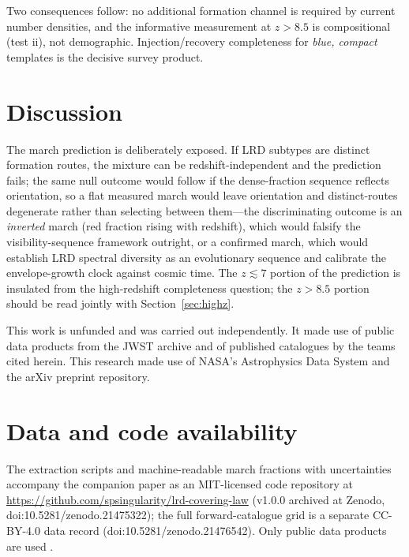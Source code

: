 \documentclass[twocolumn]{aastex631}
\begin{document}
Two consequences follow: no additional formation channel is required by
current number densities, and the informative measurement at $z>8.5$ is
compositional (test ii), not demographic. Injection/recovery completeness
for \emph{blue, compact} templates is the decisive survey product.

\section{Discussion}\label{sec:disc}
The march prediction is deliberately exposed. If LRD subtypes are
distinct formation routes, the mixture can be redshift-independent and
the prediction fails; the same null outcome would follow if the
dense-fraction sequence reflects orientation, so a flat measured march
would leave orientation and distinct-routes degenerate rather than
selecting between them---the discriminating outcome is an
\emph{inverted} march (red fraction rising with redshift), which would
falsify the visibility-sequence framework outright, or a confirmed march,
which would establish LRD spectral diversity as an evolutionary sequence
and calibrate the envelope-growth clock against cosmic time. The
$z\lesssim7$ portion of the prediction is insulated from the
high-redshift completeness question; the $z>8.5$ portion should be read
jointly with Section~\ref{sec:highz}.

\begin{acknowledgments}
This work is unfunded and was carried out independently. It made use of
public data products from the JWST archive and of published catalogues by
the teams cited herein. This research made use of NASA's Astrophysics Data
System and the arXiv preprint repository.
\end{acknowledgments}



\section*{Data and code availability}
The extraction scripts and machine-readable march fractions with
uncertainties accompany the companion paper as an MIT-licensed code
repository at \url{https://github.com/spsingularity/lrd-covering-law}
(v1.0.0 archived at Zenodo, doi:10.5281/zenodo.21475322); the full
forward-catalogue grid is a separate CC-BY-4.0 data record
(doi:10.5281/zenodo.21476542). Only public data products are used
\citep{Rinaldi2026,Ma2026,PerezGonzalez2026,Hviding2025,Sok2026}.
\end{document}
